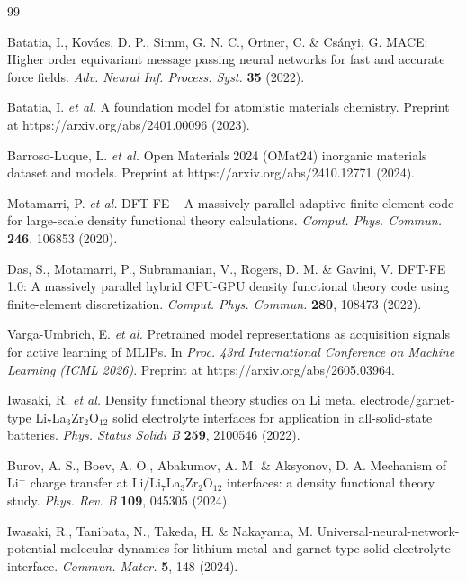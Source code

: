 \documentclass[11pt]{article}
\begin{document}
\begin{thebibliography}{99}

Batatia, I., Kov\'acs, D. P., Simm, G. N. C., Ortner, C. \& Cs\'anyi, G. MACE:
Higher order equivariant message passing neural networks for fast and accurate
force fields. \emph{Adv. Neural Inf. Process. Syst.} \textbf{35} (2022).

Batatia, I. \emph{et al.} A foundation model for atomistic materials chemistry.
Preprint at https://arxiv.org/abs/2401.00096 (2023).

Barroso-Luque, L. \emph{et al.} Open Materials 2024 (OMat24) inorganic materials
dataset and models. Preprint at https://arxiv.org/abs/2410.12771 (2024).

Motamarri, P. \emph{et al.} DFT-FE -- A massively parallel adaptive
finite-element code for large-scale density functional theory calculations.
\emph{Comput. Phys. Commun.} \textbf{246}, 106853 (2020).

Das, S., Motamarri, P., Subramanian, V., Rogers, D. M. \& Gavini, V. DFT-FE 1.0:
A massively parallel hybrid CPU-GPU density functional theory code using
finite-element discretization. \emph{Comput. Phys. Commun.} \textbf{280},
108473 (2022).

Varga-Umbrich, E. \emph{et al.} Pretrained model representations as acquisition
signals for active learning of MLIPs. In \emph{Proc. 43rd International
Conference on Machine Learning (ICML 2026)}. Preprint at
https://arxiv.org/abs/2605.03964.

Iwasaki, R. \emph{et al.} Density functional theory studies on Li metal
electrode/garnet-type Li$_7$La$_3$Zr$_2$O$_{12}$ solid electrolyte interfaces
for application in all-solid-state batteries. \emph{Phys. Status Solidi B}
\textbf{259}, 2100546 (2022).

Burov, A. S., Boev, A. O., Abakumov, A. M. \& Aksyonov, D. A. Mechanism of
Li$^+$ charge transfer at Li/Li$_7$La$_3$Zr$_2$O$_{12}$ interfaces: a density
functional theory study. \emph{Phys. Rev. B} \textbf{109}, 045305 (2024).

Iwasaki, R., Tanibata, N., Takeda, H. \& Nakayama, M.
Universal-neural-network-potential molecular dynamics for lithium metal and
garnet-type solid electrolyte interface. \emph{Commun. Mater.} \textbf{5}, 148
(2024).


\end{thebibliography}
\end{document}
